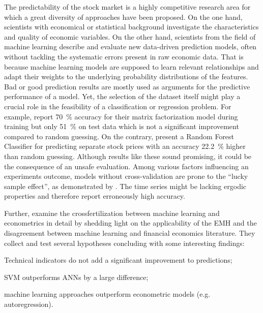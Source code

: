 The predictability of the stock market is a highly competitive research area for which a great diversity of approaches have been proposed. On the one hand, scientists with economical or statistical background investigate the characteristics and quality of economic variables. On the other hand, scientists from the field of machine learning describe and evaluate new data-driven prediction models, often without tackling the systematic errors present in raw economic data. That is because machine learning models are supposed to learn relevant relationships and adapt their weights to the underlying probability distributions of the features. Bad or good prediction results are mostly used as arguments for the predictive performance of a model. Yet, the selection of the dataset itself might play a crucial role in the feasibility of a classification or regression problem. For example, \citet{Sun2016TradePrediction} report 70~\% accuracy for their matrix factorization model during training but only 51~\% on test data which is not a significant improvement compared to random guessing. On the contrary, \citet{Lee2014OnPrediction} present a Random Forest Classifier for predicting separate stock prices with an accuracy 22.2~\% higher than random guessing. Although results like these sound promising, it could be the consequence of an unsafe evaluation. Among various factors influencing an experiments outcome, models without cross-validation are prone to the \enquote{lucky sample effect}, as demonstrated by \citet{Hsu2016BridgingEconomists}. The time series might be lacking ergodic properties and therefore report erroneously high accuracy.

Further, \citet{Hsu2016BridgingEconomists} examine the crossfertilization between machine learning and econometrics in detail by shedding light on the applicability of the EMH and the disagreement between machine learning and financial economics literature. They collect and test several hypotheses concluding with some interesting findings: \begin{enumerate*}[label=(\roman*)] \item Technical indicators do not add a significant improvement to predictions;
\item SVM outperforms ANNs by a large difference;
\item machine learning approaches outperform econometric models (e.g. autoregression).
\end{enumerate*}

